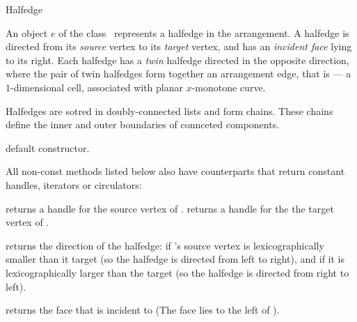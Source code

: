 
\ccRefPageBegin

\begin{ccRefClass}{Halfedge}

\ccThreeToTwo

\ccDefinition
An object $e$ of the class \ccRefName\ represents a halfedge in the
arrangement. A halfedge is directed from its \emph{source} vertex
to its \emph{target} vertex, and has an \emph{incident face} lying to
its right. Each halfedge has a \emph{twin} halfedge directed in the
opposite direction, where the pair of twin halfedges form together
an arrangement edge, that is --- a $1$-dimensional cell, associated
with planar $x$-monotone curve.

Halfedges are sotred in doubly-connected lists and form chains. These
chains define the inner and outer boundaries of connceted components.

\ccInheritsFrom

\ccCreation
{}

   {default constructor.}    	    
    
\ccAccessFunctions

All non-const methods listed below also have  counterparts
that return constant handles, iterators or circulators:
    
    {returns a handle for the source vertex of \ccVar{}.}
\ccGlue
{}
    {returns a handle for the the target vertex of \ccVar{}.}

    {returns the direction of the halfedge:  if \ccVar{}'s
     source vertex is lexicographically smaller than it target (so the
     halfedge is directed from left to right), and  if it is
     lexicographically larger than the target (so the halfedge is directed
     from right to left).}

    {returns the face that \ccVar{} is incident to (The face lies to
    the left of ).}


\end{ccRefClass}
